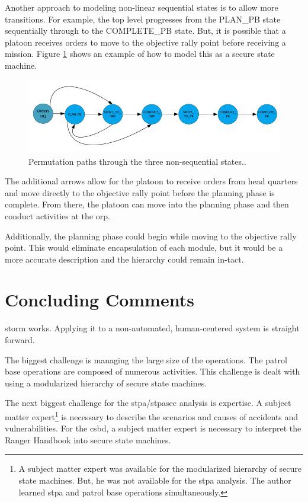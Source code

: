 \documentclass[../../main/main.tex]{subfiles}
\begin{document}
Another approach to modeling non-linear sequential states is to allow more transitions. For example, the top level progresses from the PLAN_PB state sequentially through to the COMPLETE_PB state.  But, it is possible that a platoon receives orders to move to the objective rally point before receiving a mission.  Figure \ref{toplevelAlt} shows an example of how to model this as a secure state machine. 

 \begin{figure}[h!]
\centering
\includegraphics[width=\textwidth]{../figures/toplevelAlt}
\caption{\label{toplevelAlt} Permutation paths through the three non-sequential states..}
\end{figure} 
 
The additional arrows allow for the platoon to receive orders from head quarters and move directly to the objective rally point before the planning phase is complete. From there, the platoon can move into the planning phase and then conduct activities at the \gls{orp}. 

Additionally, the planning phase could begin while moving to the objective rally point.  This would eliminate encapsulation of each module, but it would be a more accurate description and the hierarchy could remain in-tact.  

\section{Concluding Comments}
\gls{storm} works.  Applying it to a non-automated, human-centered system is straight forward.  

The biggest challenge is managing the large size of the operations.  The patrol base operations are composed of numerous activities.  This challenge is dealt with using a modularized hierarchy of secure state machines.

The next biggest challenge for the \gls{stpa}/\gls{stpasec} analysis is expertise.  A subject matter expert\footnote{A subject matter expert was available for the modularized hierarchy of secure state machines.  But, he was not available for the \gls{stpa} analysis.  The author learned \gls{stpa} and patrol base operations simultaneously.} is necessary to describe the scenarios and causes of accidents and vulnerabilities.  For the \gls{csbd}, a subject matter expert is necessary to interpret the Ranger Handbook \cite{rangermanual} into secure state machines.
\end{document}
